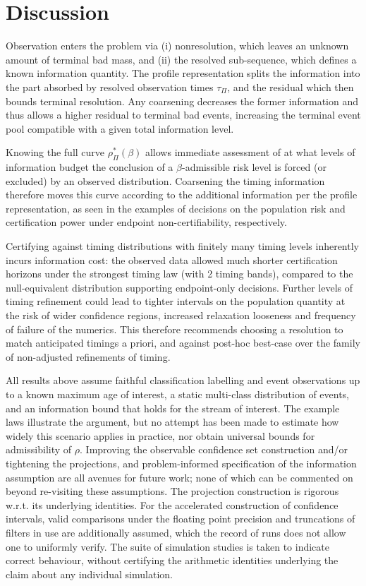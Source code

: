 \section{Discussion}\label{sec:discussion} 
Observation enters the problem via (i) nonresolution, which leaves an unknown amount of terminal bad mass, and (ii) the resolved sub-sequence, which defines a known information quantity. The profile representation splits the information into the part absorbed by resolved observation times $\tau_\Pi$, and the residual which then bounds terminal resolution. Any coarsening decreases the former information and thus allows a higher residual to terminal bad events, increasing the terminal event pool compatible with a given total information level.

Knowing the full curve $\rho_\Pi^*(\beta)$ allows immediate assessment of at what levels of information budget the conclusion of a $\beta$-admissible risk level is forced (or excluded) by an observed distribution. Coarsening the timing information therefore moves this curve according to the additional information per the profile representation, as seen in the examples of decisions on the population risk and certification power under endpoint non-certifiability, respectively.

Certifying against timing distributions with finitely many timing levels inherently incurs information cost: the observed data allowed much shorter certification horizons under the strongest timing law (with 2 timing bands), compared to the null-equivalent distribution supporting endpoint-only decisions. Further levels of timing refinement could lead to tighter intervals on the population quantity at the risk of wider confidence regions, increased relaxation looseness and frequency of failure of the numerics. This therefore recommends choosing a resolution to match anticipated timings a priori, and against post-hoc best-case over the family of non-adjusted refinements of timing.

All results above assume faithful classification labelling and event observations up to a known maximum age of interest, a static multi-class distribution of events, and an information bound that holds for the stream of interest. The example laws illustrate the argument, but no attempt has been made to estimate how widely this scenario applies in practice, nor obtain universal bounds for admissibility of $\rho$. Improving the observable confidence set construction and/or tightening the projections, and problem-informed specification of the information assumption are all avenues for future work; none of which can be commented on beyond re-visiting these assumptions. The projection construction is rigorous w.r.t. its underlying identities. For the accelerated construction of confidence intervals, valid comparisons under the floating point precision and truncations of filters in use are additionally assumed, which the record of runs does not allow one to uniformly verify. The suite of simulation studies is taken to indicate correct behaviour, without certifying the arithmetic identities underlying the claim about any individual simulation.

